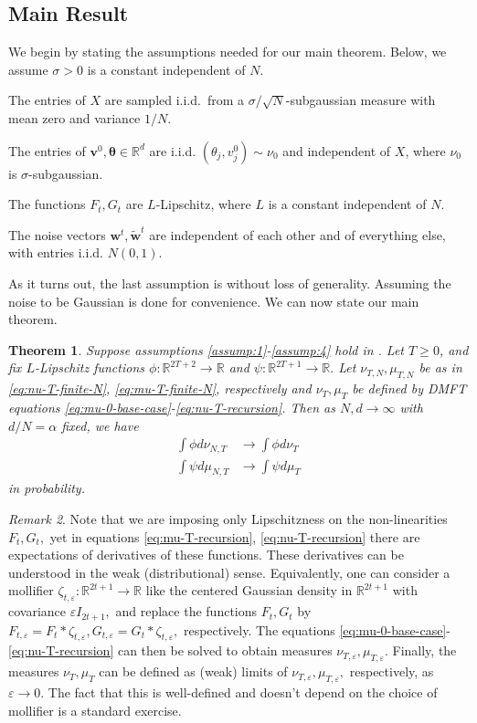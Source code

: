 \documentclass{article}
\newcommand{\1}{\mathbbm{1}}
\theoremstyle{plain}
\newtheorem{theorem}{Theorem}[section]
\theoremstyle{definition}
\theoremstyle{remark}
\newtheorem{remark}[theorem]{Remark}
\newcommand{\eps}{\varepsilon}
\newcommand{\bfv}{\boldsymbol{v}}
\newcommand{\bftheta}{\boldsymbol{\theta}}
\newcommand{\bfw}{\boldsymbol{w}}
\newcommand{\R}{\mathbb{R}}
\begin{document}
\subsection{Main Result}\label{sec:main-result}
We begin by stating the assumptions needed for our main theorem. Below, we assume $\sigma>0$ is a constant independent of $N.$
\begin{assumptions}
  \item\label{assump:1}
  The entries of $X$ are sampled i.i.d.\ from a $\sigma/\sqrt{N}$-subgaussian measure with mean zero and
  variance $1/N$.
  \item\label{assump:2} The entries of $\bfv^0,\bftheta \in \R^d$ are i.i.d. $(\theta_j,v^0_j)\sim\nu_0$ and independent of $X$, where $\nu_0$ is $\sigma$-subgaussian.
  \item \label{assump:3} The functions $F_t,G_t$ are $L$-Lipschitz, where $L$ is a constant independent of $N.$
  \item \label{assump:4} The noise vectors $\bfw^t,\tilde{\bfw}^t$ are independent of each other and of everything else, with entries i.i.d. $N(0,1).$
\end{assumptions}
As it turns out, the last assumption is without loss of generality. Assuming the noise to be Gaussian is done for convenience. We can now state our main theorem.
\begin{theorem}\label{thm:main}
    Suppose assumptions \eqref{assump:1}-\eqref{assump:4} hold in . Let $T\geq 0$, and fix $L$-Lipschitz functions $\phi:\R^{2T+2}\to \R$ and $\psi:\R^{2T+1}\to\R.$ Let $\nu_{T,N},\mu_{T,N}$ be as in \eqref{eq:nu-T-finite-N}, \eqref{eq:mu-T-finite-N}, respectively and $\nu_T,\mu_T$ be defined by DMFT equations \eqref{eq:mu-0-base-case}-\eqref{eq:nu-T-recursion}. Then as $N,d\to\infty$ with $d/N=\alpha$ fixed, we have
    \begin{align*}
        \int \phi d\nu_{N,T} &\to \int \phi d\nu_{T} \\
        \int \psi d\mu_{N,T} &\to \int \psi d\mu_{T}
    \end{align*}
    in probability.
\end{theorem}
\begin{remark}
Note that we are imposing only Lipschitzness on the non-linearities $F_t,G_t,$ yet in equations \eqref{eq:mu-T-recursion}, \eqref{eq:nu-T-recursion} there are expectations of derivatives of these functions. These derivatives can be understood in the weak (distributional) sense. Equivalently, one can consider a mollifier $\zeta_{t,\eps}:\R^{2t+1}\to \R$ like the centered Gaussian density in $\R^{2t+1}$ with covariance $\eps I_{2t+1},$ and replace the functions $F_t,G_t$ by $F_{t,\eps}= F_t*\zeta_{t,\eps},G_{t,\eps} = G_t* \zeta_{t,\eps},$ respectively. The equations \eqref{eq:mu-0-base-case}-\eqref{eq:nu-T-recursion} can then be solved to obtain measures $\nu_{T,\eps},\mu_{T,\eps}.$ Finally, the measures $\nu_T,\mu_T$ can be defined as (weak) limits of $\nu_{T,\eps},\mu_{T,\eps},$ respectively, as $\eps\to 0$. The fact that this is well-defined and doesn't depend on the choice of mollifier is a standard exercise.
\end{remark}
\end{document}
